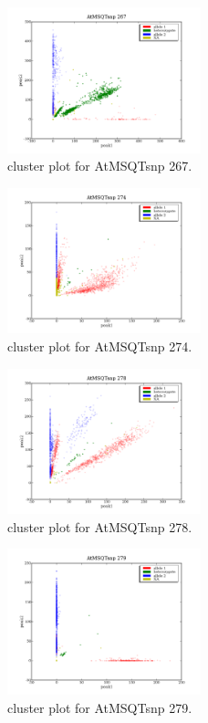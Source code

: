 \begin{figure}[H]
\includegraphics[width=0.5\textwidth]{figures/cluster_plot_AtMSQTsnp_267.png}
\caption{cluster plot for AtMSQTsnp 267.} \label{flAtMSQTsnp267}
\end{figure}

\begin{figure}[H]
\includegraphics[width=0.5\textwidth]{figures/cluster_plot_AtMSQTsnp_274.png}
\caption{cluster plot for AtMSQTsnp 274.} \label{flAtMSQTsnp274}
\end{figure}

\begin{figure}[H]
\includegraphics[width=0.5\textwidth]{figures/cluster_plot_AtMSQTsnp_278.png}
\caption{cluster plot for AtMSQTsnp 278.} \label{flAtMSQTsnp278}
\end{figure}

\begin{figure}[H]
\includegraphics[width=0.5\textwidth]{figures/cluster_plot_AtMSQTsnp_279.png}
\caption{cluster plot for AtMSQTsnp 279.} \label{flAtMSQTsnp279}
\end{figure}

